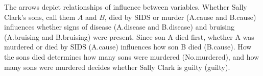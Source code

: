 \documentclass[11pt,dvipsnames,enabledeprecatedfontcommands]{scrartcl}
\begin{document}
\begin{minipage}[c]{0.6\linewidth}
\begin{figure}[H]
\end{figure}
\end{minipage} \begin{minipage}[c]{0.37\linewidth}
The arrows depict relationships of influence between variables. Whether Sally Clark's sons, call them \(A\) and \(B\), died by SIDS or murder (\textsf{A.cause} and \textsf{B.cause}) influences whether signs of disease (\textsf{A.disease} and \textsf{B.disease}) and bruising (\textsf{A.bruising} and \textsf{B.bruising})  were present. 
Since son A died first, whether A was murdered or died by SIDS (\textsf{A.cause}) influences how son B died (\textsf{B.cause}). 
How the sons died 
determines how many sons were murdered (\textsf{No.murdered}), and how many sons were murdered decides whether Sally Clark is guilty (\textsf{guilty}). 
\end{minipage}

\vspace{2mm}

\noindent
\end{document}
